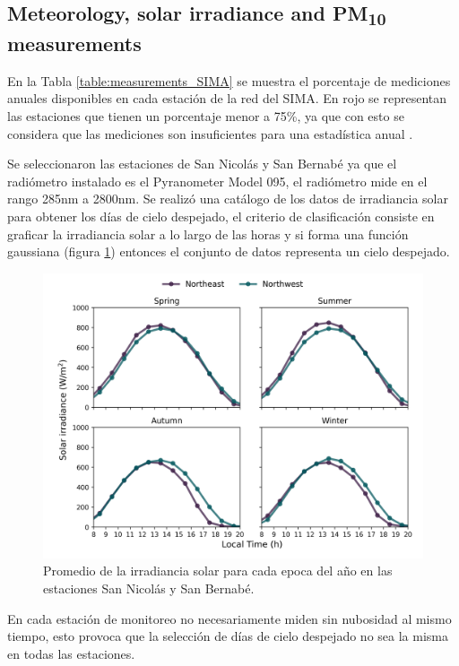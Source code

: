 \subsection{Meteorology, solar irradiance and PM\textsubscript{10} measurements}
En la Tabla \ref{table:measurements_SIMA} se muestra el porcentaje de mediciones anuales disponibles en cada estación de la red del SIMA. En rojo se representan las estaciones que tienen un porcentaje menor a 75\%, ya que con esto se considera que las mediciones son insuficientes para una estadística anual \cite{molina2019}.

Se seleccionaron las estaciones de San Nicolás y San Bernabé ya que el radiómetro instalado es el Pyranometer Model 095, el radiómetro mide en el rango 285nm a 2800nm. Se realizó una catálogo de los datos de irradiancia solar para obtener los días de cielo despejado, el criterio de clasificación consiste en graficar la irradiancia solar a lo largo de las horas y si forma una función gaussiana (figura \ref{fig:clear_days}) entonces el conjunto de datos representa un cielo despejado.
\begin{figure}[H]
    \centering
    \includegraphics[scale=0.5]{images/Clear_days.png}
    \caption{Promedio de la irradiancia solar para cada epoca del año en las estaciones San Nicolás y San Bernabé.}
    \label{fig:clear_days}
\end{figure}
En cada estación de monitoreo no necesariamente miden sin nubosidad al mismo tiempo, esto provoca que la selección de días de cielo despejado no sea la misma en todas las estaciones.